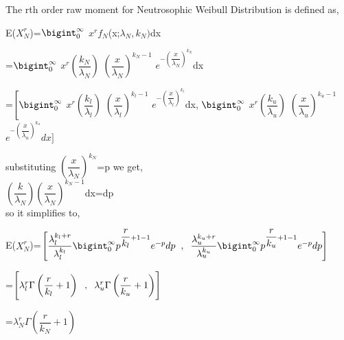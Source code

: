 \documentclass[12pt,a4paper,oneside]{article}
\begin{document}
\newpage
The rth order raw moment for Neutrosophic Weibull Distribution  is defined as,
\begin{center}
E($X_{N}^{r}$)=$\bigint_{0}^{\infty}$ $x^{r}f_{N}$(x;${\lambda_{N}},k_{N})$dx\\
\begin{singlespace}
\hspace{4.3cm}=$\bigint_{0}^{\infty}$ $x^{r}\left(\dfrac{k_{N}}{{\lambda_{N}}}\right)$ $\left(\dfrac{x}{\lambda_{N}}\right)^{k_{N}-1}$ $e^{-\left(\dfrac{x}{\lambda_{N}}\right)^{k_{N}}}$dx
\end{singlespace}\vspace*{1cm}
=$\Biggl[\bigint_{0}^{\infty}$ $x^{r}\left(\dfrac{k_{l}}{{\lambda_{l}}}\right)$ $\left(\dfrac{x}{\lambda_{l}}\right)^{k_{l}-1}$ $e^{-\left(\dfrac{x}{\lambda_{l}}\right)^{k_{l}}}$dx\hspace{2mm},\hspace{2mm} $\bigint_{0}^{\infty}$ $x^{r}\left(\dfrac{k_{u}}{{\lambda_{u}}}\right)$ $\left(\dfrac{x}{\lambda_{u}}\right)^{k_{u}-1}$ $e^{-\left(\dfrac{x}{\lambda_{u}}\right)^{k_{u}}}dx\Biggr]$
\end{center}
substituting $\left(\dfrac{x}{{\lambda_{N}}}\right)^{k_{N}}$=p we get,\\
\newline
\hspace{2cm}$\left(\dfrac{k}{\lambda_{N}}\right)\left(\dfrac{x}{{\lambda_{N}}}\right)^{k_{N}-1}$dx=dp\\
\newline so it simplifies to,
\begin{center}
E($X_{N}^{r}$)=$\Biggl[\dfrac{\lambda_{l}^{k_{l}+r}}{\lambda_{l}^{k_{l}}} \bigint_{0}^{\infty} p^{\dfrac{r}{k_{l}}+1-1}e^{-p}dp\hspace{2mm},\hspace{2mm}\dfrac{\lambda_{u}^{k_{u}+r}}{\lambda_{u}^{k_{u}}} \bigint_{0}^{\infty} p^{\dfrac{r}{k_{u}}+1-1}e^{-p}dp\Biggr]$
\end{center}
\begin{singlespace}
\hspace*{4.5cm}=$\Biggl[{\lambda_{l}^{r}}\Gamma\left(\dfrac{r}{k_{l}}+1\right)\hspace{2mm},\hspace{2mm}{\lambda_{u}^{r}}\Gamma\left(\dfrac{r}{k_{u}}+1\right)\Biggr]$
\end{singlespace}
\hspace*{4.5cm}=$\boxed{{\lambda_{N}^{r}}\Gamma\left(\dfrac{r}{k_{N}}+1\right)}$\newline\newline
\end{document}
